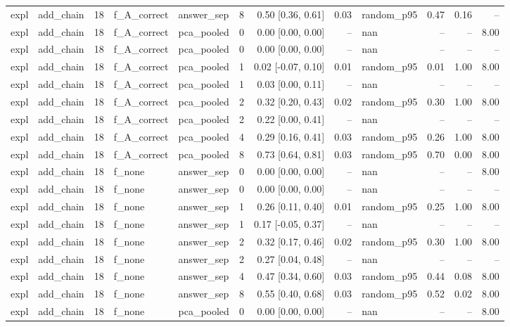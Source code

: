 \begin{tabular}{llrllrrrlrrr}
expl & add\_chain & 18 & f\_A\_correct & answer\_sep & 8 & 0.50 [0.36, 0.61] & 0.03 & random\_p95 & 0.47 & 0.16 & -- \\
expl & add\_chain & 18 & f\_A\_correct & pca\_pooled & 0 & 0.00 [0.00, 0.00] & -- & nan & -- & -- & 8.00 \\
expl & add\_chain & 18 & f\_A\_correct & pca\_pooled & 0 & 0.00 [0.00, 0.00] & -- & nan & -- & -- & -- \\
expl & add\_chain & 18 & f\_A\_correct & pca\_pooled & 1 & 0.02 [-0.07, 0.10] & 0.01 & random\_p95 & 0.01 & 1.00 & 8.00 \\
expl & add\_chain & 18 & f\_A\_correct & pca\_pooled & 1 & 0.03 [0.00, 0.11] & -- & nan & -- & -- & -- \\
expl & add\_chain & 18 & f\_A\_correct & pca\_pooled & 2 & 0.32 [0.20, 0.43] & 0.02 & random\_p95 & 0.30 & 1.00 & 8.00 \\
expl & add\_chain & 18 & f\_A\_correct & pca\_pooled & 2 & 0.22 [0.00, 0.41] & -- & nan & -- & -- & -- \\
expl & add\_chain & 18 & f\_A\_correct & pca\_pooled & 4 & 0.29 [0.16, 0.41] & 0.03 & random\_p95 & 0.26 & 1.00 & 8.00 \\
expl & add\_chain & 18 & f\_A\_correct & pca\_pooled & 8 & 0.73 [0.64, 0.81] & 0.03 & random\_p95 & 0.70 & 0.00 & 8.00 \\
expl & add\_chain & 18 & f\_none & answer\_sep & 0 & 0.00 [0.00, 0.00] & -- & nan & -- & -- & 8.00 \\
expl & add\_chain & 18 & f\_none & answer\_sep & 0 & 0.00 [0.00, 0.00] & -- & nan & -- & -- & -- \\
expl & add\_chain & 18 & f\_none & answer\_sep & 1 & 0.26 [0.11, 0.40] & 0.01 & random\_p95 & 0.25 & 1.00 & 8.00 \\
expl & add\_chain & 18 & f\_none & answer\_sep & 1 & 0.17 [-0.05, 0.37] & -- & nan & -- & -- & -- \\
expl & add\_chain & 18 & f\_none & answer\_sep & 2 & 0.32 [0.17, 0.46] & 0.02 & random\_p95 & 0.30 & 1.00 & 8.00 \\
expl & add\_chain & 18 & f\_none & answer\_sep & 2 & 0.27 [0.04, 0.48] & -- & nan & -- & -- & -- \\
expl & add\_chain & 18 & f\_none & answer\_sep & 4 & 0.47 [0.34, 0.60] & 0.03 & random\_p95 & 0.44 & 0.08 & 8.00 \\
expl & add\_chain & 18 & f\_none & answer\_sep & 8 & 0.55 [0.40, 0.68] & 0.03 & random\_p95 & 0.52 & 0.02 & 8.00 \\
expl & add\_chain & 18 & f\_none & pca\_pooled & 0 & 0.00 [0.00, 0.00] & -- & nan & -- & -- & 8.00 \\

\end{tabular}
